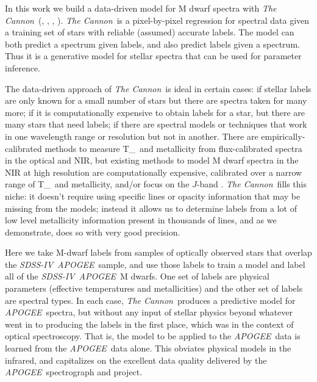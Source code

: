 \documentclass[modern]{aastex62}
\newcommand{\apogee}{\textsl{APOGEE}}
\newcommand{\thecannon}{\textsl{The Cannon}}
\newcommand{\sdssiv}{\textsl{SDSS-IV}}
\newcommand{\teff}{T_{\mathrm{eff}}}
\begin{document}

In this work we build a data-driven model for M dwarf spectra with \thecannon\ (\citealt{Ness:2015}, \citealt{Ho:2017a}, \citealt{Casey:2016}, \citealt{Behmard2019}).
\thecannon\ is a pixel-by-pixel regression for spectral data given a training set of stars with reliable (assumed) accurate labels. The model can both predict a spectrum given labels, and also predict labels given a spectrum. Thus it is a generative model for stellar spectra that can be used for parameter inference.

The data-driven approach of \thecannon\ is ideal in certain cases:
if stellar labels are only known for a small number of stars
but there are spectra taken for many more;
if it is computationally expensive to obtain labels for a star, but
there are many stars that need labels;
if there are spectral models or techniques that work in one wavelength range or resolution but not in another.
There are empirically-calibrated methods to measure \teff\ and metallicity from flux-calibrated spectra in the optical and NIR, but existing methods to model M dwarf spectra in the NIR at high resolution are computationally expensive, calibrated over a narrow range of \teff\ and metallicity, and/or focus on the $J$-band \citep{Lindgren:2016, Lindgren:2017}. \thecannon\ fills this niche: it doesn't require using specific lines or opacity information that may be missing from the models; instead it allows us to determine labels from a lot of low level metallicity information present in thousands of lines, and as we demonstrate, does so with very good precision.

Here we take M-dwarf labels from samples of optically observed stars that overlap the
\sdssiv\ \apogee\ sample, and use those labels to train a model and label all of the
\sdssiv\ \apogee\ M dwarfs.
One set of labels are physical parameters (effective temperatures and metallicities)
and the other set of labels are spectral types.
In each case, \thecannon\ produces a predictive model for \apogee\ spectra, but without
any input of stellar physics beyond whatever went in to producing the labels in the first
place, which was in the context of optical spectroscopy. That is, the model to be applied to the \apogee\ data is learned from the \apogee\ data alone.
This obviates physical models in the infrared, and capitalizes on the excellent data quality
delivered by the \apogee\ spectrograph and project.
\end{document}
